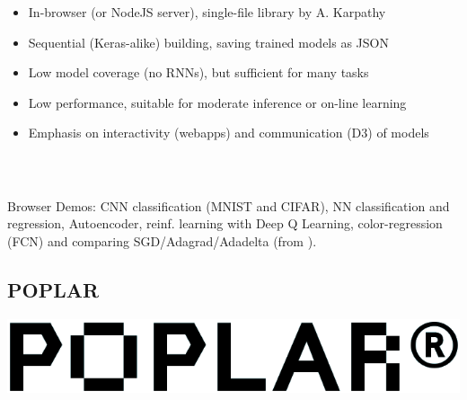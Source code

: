 \documentclass[hyperref={pdfpagelabels=false}]{beamer}
\begin{document}
\begin{frame}
\begin{columns}
         \begin{itemize}[<.->]
         \item \small{In-browser (or NodeJS server), single-file library by A. Karpathy}
         \item \small{Sequential (Keras-alike) building, saving trained models as JSON}
         \item \small{Low model coverage (no RNNs), but sufficient for many tasks}
         \item \small{Low performance, suitable for moderate inference or on-line learning}
         \item \small{Emphasis on interactivity (webapps) and communication (D3) of models}
         \end{itemize}
       \end{columns}
       \tiny{\\Browser Demos: CNN classification (MNIST and CIFAR), NN classification and regression, Autoencoder, reinf. learning with Deep Q Learning, color-regression (FCN) and comparing SGD/Adagrad/Adadelta (from \cite{convnetjs-web}).}
       
     \end{frame}
          
     \subsection{POPLAR} %
     \begin{frame}[c] %
       \begin{center}
         \vspace{8mm}
         \includegraphics[scale=0.18]{logo_poplar.png}
       \end{center}
     \end{frame}
\end{document}
